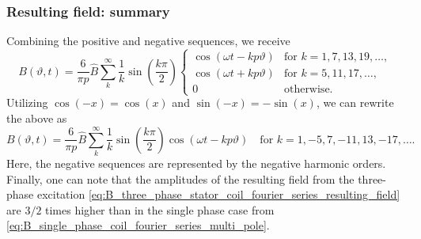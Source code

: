 \begin{frame}
	\frametitle{Resulting field: summary}
    Combining the positive and negative sequences, we receive
    \begin{equation}
        B(\vartheta, t) = \frac{6}{\pi p} \hat{B} \sum_{k}^{\infty} \frac{1}{k} \sin\left(\frac{k \pi}{2}\right) \begin{cases}
            \cos(\omega t - k p \vartheta) & \text{for } k=1,7,13,19,\ldots, \\
            \cos(\omega t + k p \vartheta) & \text{for } k=5,11,17,\ldots, \\
            0 & \text{otherwise}.
        \end{cases}
    \end{equation}
    Utilizing $\cos(-x)=\cos(x)$ and $\sin(-x)=-\sin(x)$, we can rewrite the above as
    \begin{equation}
        B(\vartheta, t) = \frac{6}{\pi p} \hat{B} \sum_{k}^{\infty} \frac{1}{k} \sin\left(\frac{k \pi}{2}\right) \cos(\omega t - k p \vartheta) \quad \mbox{for } k=1,-5,7,-11,13,-17,\ldots.
        \label{eq:B_three_phase_stator_coil_fourier_series_resulting_field}
    \end{equation}
    Here, the negative sequences are represented by the negative harmonic orders. Finally, one can note that the amplitudes of the resulting field from the three-phase excitation \eqref{eq:B_three_phase_stator_coil_fourier_series_resulting_field} are $3/2$ times higher than in the single phase case from \eqref{eq:B_single_phase_coil_fourier_series_multi_pole}.
\end{frame}

